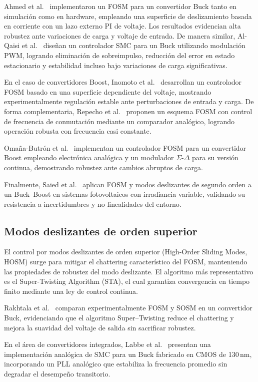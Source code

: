 \documentclass[12pt,oneside,openany]{book}
\begin{document}
Ahmed et al.~\cite{ea_13} implementaron un FOSM para un convertidor Buck tanto en simulación como en hardware, empleando una superficie de deslizamiento basada en corriente con un lazo externo PI de voltaje. Los resultados evidencian alta robustez ante variaciones de carga y voltaje de entrada. De manera similar, Al-Qaisi et al.~\cite{ea_14} diseñan un controlador SMC para un Buck utilizando modulación PWM, logrando eliminación de sobreimpulso, reducción del error en estado estacionario y estabilidad incluso bajo variaciones de carga significativas.

En el caso de convertidores Boost, Inomoto et al.~\cite{ea_smbboost1} desarrollan un controlador FOSM basado en una superficie dependiente del voltaje, mostrando experimentalmente regulación estable ante perturbaciones de entrada y carga. De forma complementaria, Repecho et al.~\cite{ea_smc_repecho2018} proponen un esquema FOSM con control de frecuencia de conmutación mediante un comparador analógico, logrando operación robusta con frecuencia casi constante.

Omaña-Butrón et al.~\cite{ea_omana} implementan un controlador FOSM para un convertidor Boost empleando electrónica analógica y un modulador $\Sigma\text{-}\Delta$ para su versión continua, demostrando robustez ante cambios abruptos de carga.

Finalmente, Saied et al.~\cite{ea_bbfosm} aplican FOSM y modos deslizantes de segundo orden a un Buck–Boost en sistemas fotovoltaicos con irradiancia variable, validando su resistencia a incertidumbres y no linealidades del entorno.

\subsection{Modos deslizantes de orden superior}

El control por modos deslizantes de orden superior (High-Order Sliding Modes, HOSM) surge para mitigar el chattering característico del FOSM, manteniendo las propiedades de robustez del modo deslizante. El algoritmo más representativo es el Super-Twisting Algorithm (STA), el cual garantiza convergencia en tiempo finito mediante una ley de control continua.

Rakhtala et al.~\cite{ea_15} comparan experimentalmente FOSM y SOSM en un convertidor Buck, evidenciando que el algoritmo Super–Twisting reduce el chattering y mejora la suavidad del voltaje de salida sin sacrificar robustez.

En el área de convertidores integrados, Labbe et al.~\cite{ea_16} presentan una implementación analógica de SMC para un Buck fabricado en CMOS de 130\,nm, incorporando un PLL analógico que estabiliza la frecuencia promedio sin degradar el desempeño transitorio.
\end{document}
